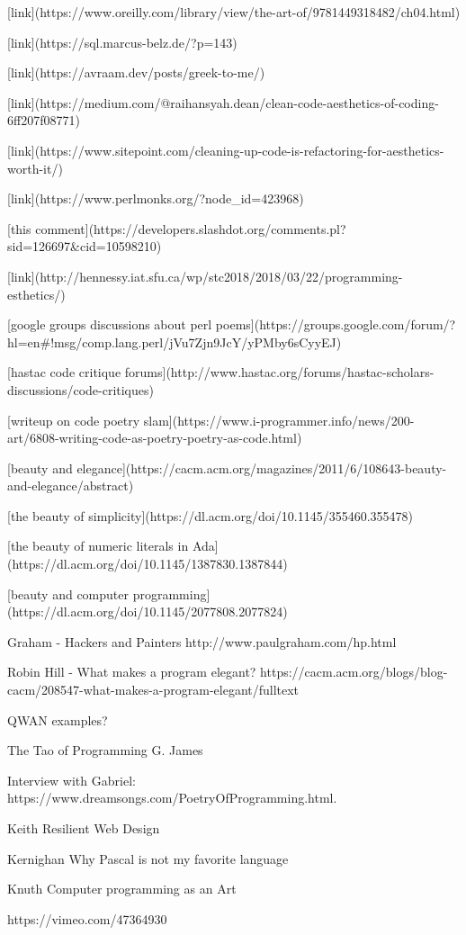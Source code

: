 [link](https://www.oreilly.com/library/view/the-art-of/9781449318482/ch04.html)

[link](https://sql.marcus-belz.de/?p=143)

[link](https://avraam.dev/posts/greek-to-me/)

[link](https://medium.com/@raihansyah.dean/clean-code-aesthetics-of-coding-6ff207f08771)

[link](https://www.sitepoint.com/cleaning-up-code-is-refactoring-for-aesthetics-worth-it/)

[link](https://www.perlmonks.org/?node_id=423968)

[this comment](https://developers.slashdot.org/comments.pl?sid=126697&cid=10598210)

[link](http://hennessy.iat.sfu.ca/wp/stc2018/2018/03/22/programming-esthetics/)

[google groups discussions about perl poems](https://groups.google.com/forum/?hl=en#!msg/comp.lang.perl/jVu7Zjn9JcY/yPMby6sCyyEJ)

[hastac code critique forums](http://www.hastac.org/forums/hastac-scholars-discussions/code-critiques)

[writeup on code poetry slam](https://www.i-programmer.info/news/200-art/6808-writing-code-as-poetry-poetry-as-code.html)

[beauty and elegance](https://cacm.acm.org/magazines/2011/6/108643-beauty-and-elegance/abstract)

[the beauty of simplicity](https://dl.acm.org/doi/10.1145/355460.355478)

[the beauty of numeric literals in Ada](https://dl.acm.org/doi/10.1145/1387830.1387844)

[beauty and computer programming](https://dl.acm.org/doi/10.1145/2077808.2077824)

Graham - Hackers and Painters http://www.paulgraham.com/hp.html

Robin Hill - What makes a program elegant? https://cacm.acm.org/blogs/blog-cacm/208547-what-makes-a-program-elegant/fulltext

QWAN examples?

The Tao of Programming G. James

Interview with Gabriel: https://www.dreamsongs.com/PoetryOfProgramming.html.

Keith Resilient Web Design

Kernighan Why Pascal is not my favorite language

Knuth Computer programming as an Art

https://vimeo.com/47364930